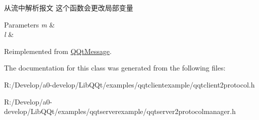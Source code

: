 从流中解析报文 这个函数会更改局部变量 


\begin{DoxyParams}{Parameters}
{\em m} & \\
\hline
{\em l} & \\
\hline
\end{DoxyParams}


Reimplemented from \mbox{\hyperlink{class_q_qt_message_a0bc25669bdd61490b1d8df6d77565f31}{Q\+Qt\+Message}}.



The documentation for this class was generated from the following files\+:\begin{DoxyCompactItemize}
\item 
R\+:/\+Develop/a0-\/develop/\+Lib\+Q\+Qt/examples/qqtclientexample/qqtclient2protocol.\+h\item 
R\+:/\+Develop/a0-\/develop/\+Lib\+Q\+Qt/examples/qqtserverexample/qqtserver2protocolmanager.\+h\end{DoxyCompactItemize}
